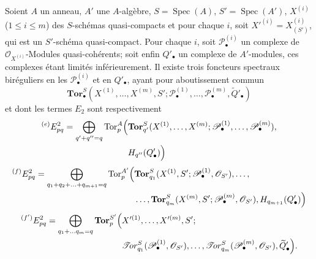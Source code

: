 \begin{corollary}[6.9.4]
Soient $A$ un anneau, $A'$ une $A$-algèbre,
$S=\operatorname{Spec}(A)$, $S'=\operatorname{Spec}(A')$,
$X^{(i)}$ ($1\leq i\leq m$) des $S$-schémas quasi-compacts et pour chaque
$i$, soit $X'^{(i)}=X_{(S')}^{(i)}$, qui est un $S'$-schéma quasi-compact.
Pour chaque $i$, soit $\mathscr P_\bullet^{(i)}$ un complexe de
$\mathscr O_{X^{(i)}}$-Modules quasi-cohérents; soit enfin $Q'_\bullet$ un
complexe de $A'$-modules, ces complexes étant limités inférieurement. Il
existe trois foncteurs spectraux biréguliers en les
$\mathscr P_\bullet^{(i)}$ et en $Q'_\bullet$, ayant pour aboutissement commun
\[
  \mathbf{Tor}_\bullet^S
  (X^{(1)},\ldots,X^{(m)},S';
   \mathscr P_\bullet^{(1)},\ldots,\mathscr P_\bullet^{(m)},
   \widetilde{Q}'_\bullet)
\]
et dont les termes $E_2$ sont respectivement
\[
\begin{split}
  {}^{(e)}E_{pq}^2
  =\bigoplus_{q'+q''=q}
  \operatorname{Tor}_p^A\Bigl(
  &\mathbf{Tor}_{q'}^S
  (X^{(1)},\ldots,X^{(m)};
   \mathscr P_\bullet^{(1)},\ldots,\mathscr P_\bullet^{(m)}),\\
  &H_{q''}(Q'_\bullet)
  \Bigr)
\end{split}
\]
\[
\begin{split}
  {}^{(f)}E_{pq}^2
  =\bigoplus_{q_1+q_2+\ldots+q_{m+1}=q}
  \operatorname{Tor}_p^{A'}\Bigl(
  &\mathbf{Tor}_{q_1}^S
  (X^{(1)},S';\mathscr P_\bullet^{(1)},\mathscr O_{S'}),\ldots,\\
  &\ldots,\mathbf{Tor}_{q_m}^S
  (X^{(m)},S';\mathscr P_\bullet^{(m)},\mathscr O_{S'}),
  H_{q_{m+1}}(Q'_\bullet)
  \Bigr)
\end{split}
\]
\[
\begin{split}
  {}^{(f')}E_{pq}^2
  =\bigoplus_{q_1+\ldots q_m=q}
  \mathbf{Tor}_p^{S'}\Bigl(
  &X'^{(1)},\ldots,X'^{(m)},S';\\
  &\mathscr{T}\!or_{q_1}^S
  (\mathscr P_\bullet^{(1)},\mathscr O_{S'}),\ldots,
  \mathscr{T}\!or_{q_m}^S
  (\mathscr P_\bullet^{(m)},\mathscr O_{S'}),
  \widetilde{Q}'_\bullet
  \Bigr).
\end{split}
\]
\end{corollary}

